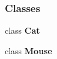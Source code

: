 \subsubsection*{Classes}
\begin{DoxyCompactItemize}
\item 
class {\bf Cat}
\item 
class {\bf Mouse}
\end{DoxyCompactItemize}
